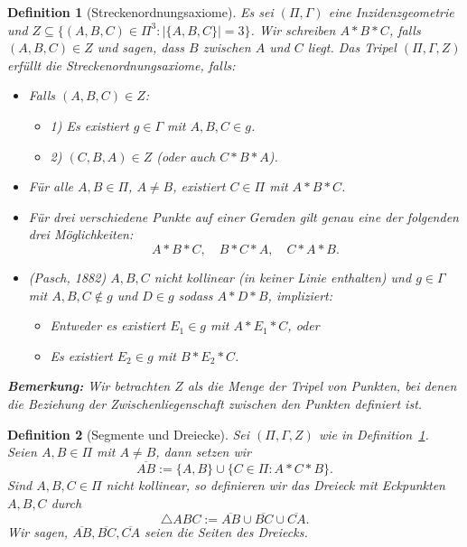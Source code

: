 \documentclass[a4paper,12pt]{article}
\theoremstyle{break}
\newtheorem{definition}{Definition}[section]
\begin{document}
\begin{definition}[Streckenordnungsaxiome]\label{def:strecken_axiome}
Es sei \((\Pi, \Gamma)\) eine Inzidenzgeometrie und \(Z \subseteq \{ (A, B, C) \in \Pi^3 : | \{A, B, C \} | = 3 \}\). Wir schreiben \(A * B * C\), falls \((A, B, C) \in Z\) und sagen, dass \(B\) zwischen \(A\) und \(C\) liegt. Das Tripel \((\Pi, \Gamma, Z)\) erfüllt die Streckenordnungsaxiome, falls:

\begin{itemize}
    \item[\textbf{(S1)}] Falls \((A, B, C) \in Z\):
    \begin{itemize}
        \item 1) Es existiert \(g \in \Gamma\) mit \(A, B, C \in g\).
        \item 2) \((C, B, A) \in Z\) (oder auch \(C * B * A\)).
    \end{itemize}
    
    \item[\textbf{(S2)}] Für alle \(A, B \in \Pi\), \(A \neq B\), existiert \(C \in \Pi\) mit \(A * B * C\).
    
    \item[\textbf{(S3)}] Für drei verschiedene Punkte auf einer Geraden gilt genau eine der folgenden drei Möglichkeiten:
    \[
    A * B * C, \quad B * C * A, \quad C * A * B.
    \]
    
    \item[\textbf{(S4)}] (Pasch, 1882) \(A, B, C\) nicht kollinear (in keiner Linie enthalten) und \(g \in \Gamma\) mit \(A, B, C \notin g\) und \(D \in g\) sodass \(A * D * B\), impliziert:
    \begin{itemize}
        \item Entweder es existiert \(E_1 \in g\) mit \(A * E_1 * C\), oder
        \item Es existiert \(E_2 \in g\) mit \(B * E_2 * C\).
    \end{itemize}
\end{itemize}
\textbf{Bemerkung:} Wir betrachten \(Z\) als die Menge der Tripel von Punkten, bei denen die Beziehung der \glqq Zwischenliegenschaft\grqq{} zwischen den Punkten definiert ist.
\end{definition}

\begin{definition}[Segmente und Dreiecke]\label{def:segmente_dreiecke}
Sei \((\Pi, \Gamma, Z)\) wie in Definition~\ref{def:strecken_axiome}. Seien \(A, B \in \Pi\) mit \(A \neq B\), dann setzen wir
\[
\overline{AB} := \{A, B\} \cup \{C \in \Pi : A * C * B\}.
\]
Sind \(A, B, C \in \Pi\) nicht kollinear, so definieren wir das Dreieck mit Eckpunkten \(A, B, C\) durch
\[
\triangle ABC := \overline{AB} \cup \overline{BC} \cup \overline{CA}.
\]
Wir sagen, \(\overline{AB}, \overline{BC}, \overline{CA}\) seien die Seiten des Dreiecks.
\end{definition}
\end{document}
